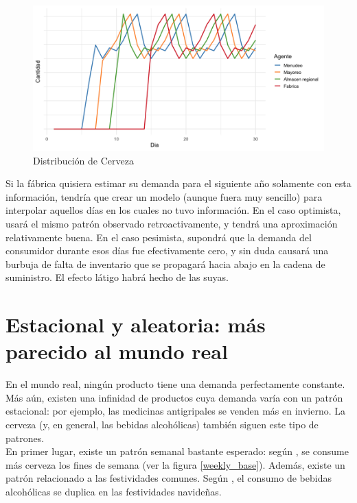\begin{figure}[ht!]
\caption{Distribuci\'on de Cerveza}
\label{analytic_2}
\includegraphics[width=12cm]{tesis_tex/figs/analytic_solution_0_all_45_inv.png}
\centering
\end{figure}

Si la f\'abrica quisiera estimar su demanda para el siguiente a\~no solamente con esta informaci\'on, tendr\'ia que crear un modelo (aunque fuera muy sencillo) para interpolar aquellos d\'ias en los cuales no tuvo informaci\'on. En el caso optimista, usar\'a el mismo patr\'on observado retroactivamente, y tendr\'a una aproximaci\'on relativamente buena. En el caso pesimista, supondr\'a que la demanda del consumidor durante esos d\'ias fue efectivamente cero, y sin duda causar\'a una burbuja de falta de inventario que se propagar\'a hacia abajo en la cadena de suministro. El efecto l\'atigo habr\'a hecho de las suyas.\\



\section{Estacional y aleatoria: m\'as parecido al mundo real}

En el mundo real, ning\'un producto tiene una demanda perfectamente constante. M\'as a\'un, existen una infinidad de productos cuya demanda var\'ia con un patr\'on estacional: por ejemplo, las medicinas antigripales se venden m\'as en invierno. La cerveza (y, en general, las bebidas alcoh\'olicas) tambi\'en siguen este tipo de patrones.\\

En primer lugar, existe un patr\'on semanal bastante esperado: seg\'un \citet{}, se consume m\'as cerveza los fines de semana (ver la figura \ref{weekly_base}). Adem\'as, existe un patr\'on relacionado a las festividades comunes. Seg\'un \citet{}, el consumo de bebidas alcoh\'olicas se duplica en las festividades navide\~nas. \\

